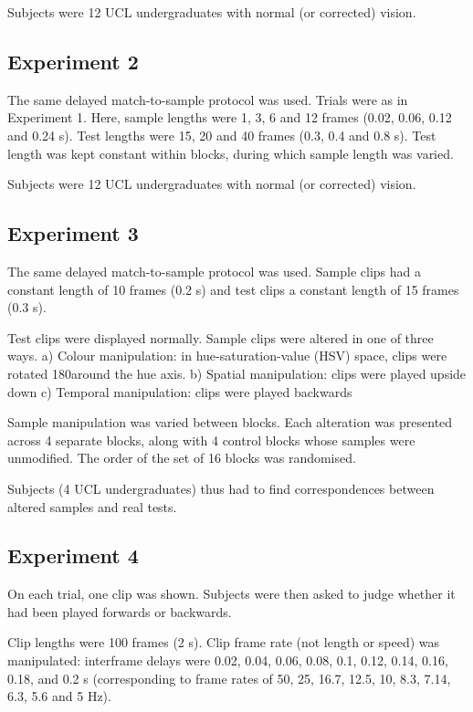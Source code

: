 \documentclass[a4paper]{article}
\begin{document}
Subjects were 12 UCL undergraduates with normal (or corrected) vision.

\subsection{Experiment 2}

The same delayed match-to-sample protocol was used. Trials were as in Experiment 1. Here, sample lengths were 1, 3, 6 and 12 frames (0.02, 0.06, 0.12 and 0.24 s). Test lengths were 15, 20 and 40 frames (0.3, 0.4 and 0.8 s). Test length was kept constant within blocks, during which sample length was varied.

Subjects were 12 UCL undergraduates with normal (or corrected) vision.

\subsection{Experiment 3}

The same delayed match-to-sample protocol was used. Sample clips had a constant length of 10 frames (0.2 s) and test clips a constant length of 15 frames (0.3 s).

Test clips were displayed normally. Sample clips were altered in one of three ways.
	a) Colour manipulation: in hue-saturation-value (HSV) space, clips were rotated 180\degree around the hue axis.
	b) Spatial manipulation: clips were played upside down
	c) Temporal manipulation: clips were played backwards

Sample manipulation was varied between blocks. Each alteration was presented across 4 separate blocks, along with 4 control blocks whose samples were unmodified. The order of the set of 16 blocks was randomised.

Subjects (4 UCL undergraduates) thus had to find correspondences between altered samples and real tests.


\subsection{Experiment 4}

On each trial, one clip was shown. Subjects were then asked to judge whether it had been played forwards or backwards.

Clip lengths were 100 frames (2 s). Clip frame rate (not length or speed) was manipulated: interframe delays were 0.02, 0.04, 0.06, 0.08, 0.1, 0.12, 0.14, 0.16, 0.18, and 0.2 s (corresponding to frame rates of 50, 25, 16.7, 12.5, 10, 8.3, 7.14, 6.3, 5.6 and 5 Hz).
\end{document}
